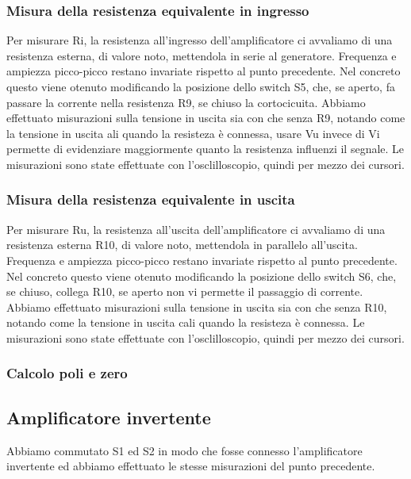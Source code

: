 \documentclass[a4paper]{article}
\begin{document}
			\subsubsection{Misura della resistenza equivalente in ingresso}
				Per misurare Ri, la resistenza all'ingresso dell'amplificatore ci avvaliamo di una resistenza esterna, di valore noto, mettendola in serie al generatore.
				Frequenza e ampiezza picco-picco restano invariate rispetto al punto precedente. 
				Nel concreto questo viene otenuto modificando la  posizione dello switch S5, che, se aperto, fa passare la corrente nella resistenza R9, se chiuso la cortocicuita.
				Abbiamo effettuato misurazioni sulla tensione in uscita sia con che senza R9, notando come la tensione in uscita ali quando la resisteza è connessa, usare Vu invece di Vi permette di evidenziare maggiormente quanto la resistenza influenzi il segnale. %
				Le misurazioni sono state effettuate con l'osclilloscopio, quindi per mezzo dei cursori.
			\subsubsection{Misura della resistenza equivalente in uscita}	
				Per misurare Ru, la resistenza all'uscita dell'amplificatore ci avvaliamo di una resistenza esterna R10, di valore noto, mettendola in parallelo all'uscita.
				Frequenza e ampiezza picco-picco restano invariate rispetto al punto precedente. 
				Nel concreto questo viene otenuto modificando la  posizione dello switch S6, che, se chiuso, collega R10, se aperto non vi permette il passaggio di corrente.
				Abbiamo effettuato misurazioni sulla tensione in uscita sia con che senza R10, notando come la tensione in uscita cali quando la resisteza è connessa. %
				Le misurazioni sono state effettuate con l'osclilloscopio, quindi per mezzo dei cursori.
				\subsubsection{Calcolo poli e zero}
		\subsection{Amplificatore invertente}
			Abbiamo commutato S1 ed S2 in modo che fosse connesso l'amplificatore invertente ed abbiamo effettuato le stesse misurazioni del punto precedente.
		
\end{document}
